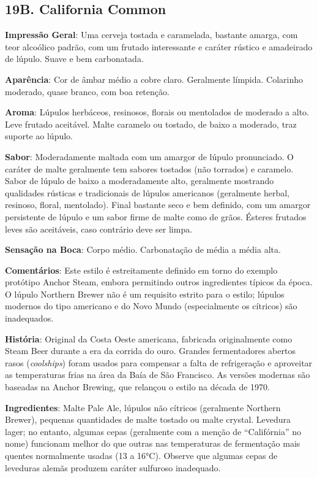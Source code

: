 \subsection*{19B. California Common}

\textbf{Impressão Geral}: Uma cerveja tostada e caramelada, bastante amarga, com teor alcoólico padrão, com um frutado interessante e caráter rústico e amadeirado de lúpulo. Suave e bem carbonatada.

\textbf{Aparência}: Cor de âmbar médio a cobre claro. Geralmente límpida. Colarinho moderado, quase branco, com boa retenção.

\textbf{Aroma}: Lúpulos herbáceos, resinosos, florais ou mentolados de moderado a alto. Leve frutado aceitável. Malte caramelo ou tostado, de baixo a moderado, traz suporte ao lúpulo.

\textbf{Sabor}: Moderadamente maltada com um amargor de lúpulo pronunciado. O caráter de malte geralmente tem sabores tostados (não torrados) e caramelo. Sabor de lúpulo de baixo a moderadamente alto, geralmente mostrando qualidades rústicas e tradicionais de lúpulos americanos (geralmente herbal, resinoso, floral, mentolado). Final bastante seco e bem definido, com um amargor persistente de lúpulo e um sabor firme de malte como de grãos. Ésteres frutados leves são aceitáveis, caso contrário deve ser limpa.

\textbf{Sensação na Boca}: Corpo médio. Carbonatação de média a média alta.

\textbf{Comentários}: Este estilo é estreitamente definido em torno do exemplo protótipo Anchor Steam, embora permitindo outros ingredientes típicos da época. O lúpulo Northern Brewer não é um requisito estrito para o estilo; lúpulos modernos do tipo americano e do Novo Mundo (especialmente os cítricos) são inadequados.

\textbf{História}: Original da Costa Oeste americana, fabricada originalmente como Steam Beer durante a era da corrida do ouro. Grandes fermentadores abertos rasos (\textit{coolships}) foram usados para compensar a falta de refrigeração e aproveitar as temperaturas frias na área da Baía de São Francisco. As versões modernas são baseadas na Anchor Brewing, que relançou o estilo na década de 1970.

\textbf{Ingredientes}: Malte Pale Ale, lúpulos não cítricos (geralmente Northern Brewer), pequenas quantidades de malte tostado ou malte crystal. Levedura lager; no entanto, algumas cepas (geralmente com a menção de “Califórnia” no nome) funcionam melhor do que outras nas temperaturas de fermentação mais quentes normalmente usadas (13 a 16°C). Observe que algumas cepas de leveduras alemãs produzem caráter sulfuroso inadequado.

